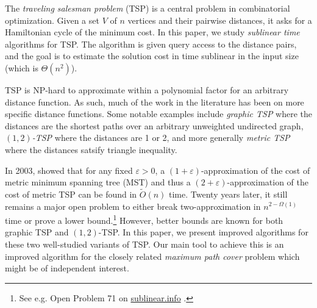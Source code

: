 \documentclass[letterpaper,11pt]{article}
\renewcommand{\epsilon}{\varepsilon}
\begin{document}
The {\em traveling salesman problem} (TSP) is a central problem in combinatorial optimization. Given a set $V$ of $n$ vertices and their pairwise distances, it asks for a Hamiltonian cycle of the minimum cost. In this paper, we study {\em sublinear time} algorithms for TSP. The algorithm is given query access to the distance pairs, and the goal is to estimate the solution cost in time sublinear in the input size (which is $\Theta(n^2)$).

TSP is NP-hard to approximate within a polynomial factor for an arbitrary distance function. As such, much of the work in the literature has been on more specific distance functions. Some notable examples include {\em graphic TSP} \cite{GharanSS11,MomkeS11,Mucha12,SeboV14,chen2020} where the distances are the shortest paths over an arbitrary unweighted undirected graph, {\em $(1, 2)$-TSP} \cite{AdamaszekMP18,chen2020,BermanK06,karp1972reducibility,MnichM18} where the distances are 1 or 2, and more generally {\em metric TSP} \cite{KarlinKG21,CzumajS-SIAM09,christofides1976worst,serdyukov1978nekotorykh} where the distances satsify triangle inequality. 

In 2003, \citet*{CzumajS-STOC04,CzumajS-SIAM09} showed that for any fixed $\epsilon > 0$, a $(1+\epsilon)$-approximation of the cost of metric minimum spanning tree (MST) and thus a  $(2+\epsilon)$-approximation of the cost of metric TSP can be found in $\widetilde{O}(n)$ time. Twenty years later, it still remains a major open problem to either break two-approximation in $n^{2-\Omega(1)}$ time or prove a lower bound.\footnote{See e.g. Open Problem 71 on \href{https://sublinear.info/index.php?title=Open_Problems:71}{sublinear.info} \cite{sublinear-info}.}
However, better bounds are known for both graphic TSP and $(1,2)$-TSP. In this paper, we present improved algorithms for these two well-studied variants of TSP. Our main tool to achieve this is an improved algorithm for the closely related {\em maximum path cover} problem which might be of independent interest.





\vspace{-0.2cm}
\end{document}
